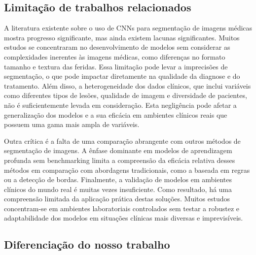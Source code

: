 \subsection{Limitação de trabalhos relacionados}

    A literatura existente sobre o uso de \acp{CNN} para segmentação de imagens médicas mostra progresso significante, mas ainda existem lacunas significantes. Muitos estudos se concentraram no desenvolvimento de modelos sem considerar as complexidades inerentes às imagens médicas, como diferenças no formato tamanho e textura das feridas. Essa limitação pode levar a imprecisões de segmentação, o que pode impactar diretamente na qualidade da diagnose e do tratamento. Além disso, a heterogeneidade dos dados clínicos, que inclui variáveis como diferentes tipos de lesões, qualidade de imagem e diversidade de pacientes, não é suficientemente levada em consideração. Esta negligência pode afetar a generalização dos modelos e a sua eficácia em ambientes clínicos reais que possuem uma gama mais ampla de variáveis.

    Outra crítica é a falta de uma comparação abrangente com outros métodos de segmentação de imagens. A ênfase dominante em modelos de aprendizagem profunda sem benchmarking limita a compreensão da eficácia relativa desses métodos em comparação com abordagens tradicionais, como a baseada em regras ou a detecção de bordas. Finalmente, a validação de modelos em ambientes clínicos do mundo real é muitas vezes insuficiente. Como resultado, há uma compreensão limitada da aplicação prática destas soluções. Muitos estudos concentram-se em ambientes laboratoriais controlados sem testar a robustez e adaptabilidade dos modelos em situações clínicas mais diversas e imprevisíveis.

\subsection{Diferenciação do nosso trabalho} 


